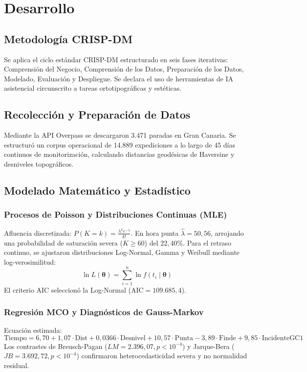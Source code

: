 \documentclass[11pt,a4paper,twoside]{report}
\begin{document}
\chapter{Desarrollo}

\section{Metodología CRISP-DM}
Se aplica el ciclo estándar CRISP-DM estructurado en seis fases iterativas: Comprensión del Negocio, Comprensión de los Datos, Preparación de los Datos, Modelado, Evaluación y Despliegue. Se declara el uso de herramientas de IA asistencial circunscrito a tareas ortotipográficas y estéticas.

\section{Recolección y Preparación de Datos}
Mediante la API Overpass se descargaron 3.471 paradas en Gran Canaria. Se estructuró un corpus operacional de 14.889 expediciones a lo largo de 45 días continuos de monitorización, calculando distancias geodésicas de Haversine y desniveles topográficos.

\section{Modelado Matemático y Estadístico}
\subsection{Procesos de Poisson y Distribuciones Continuas (MLE)}
Afluencia discretizada: $P(K=k) = \frac{\lambda^k e^{-\lambda}}{k!}$. En hora punta $\hat{\lambda} = 50,56$, arrojando una probabilidad de saturación severa ($K \ge 60$) del $22,40\%$.
Para el retraso continuo, se ajustaron distribuciones Log-Normal, Gamma y Weibull mediante log-verosimilitud:
\begin{equation}
\ln L(\boldsymbol{\theta}) = \sum_{i=1}^n \ln f(t_i \mid \boldsymbol{\theta})
\end{equation}
El criterio AIC seleccionó la Log-Normal ($\text{AIC} = 109.685,4$).

\subsection{Regresión MCO y Diagnósticos de Gauss-Markov}
Ecuación estimada:
\begin{equation}
\text{Tiempo} = 6,70 + 1,07 \cdot \text{Dist} + 0,0366 \cdot \text{Desnivel} + 10,57 \cdot \text{Punta} - 3,89 \cdot \text{Finde} + 9,85 \cdot \text{IncidenteGC1}
\end{equation}
Los contrastes de Breusch-Pagan ($LM = 2.396,07, p < 10^{-4}$) y Jarque-Bera ($JB = 3.692,72, p < 10^{-4}$) confirmaron heterocedasticidad severa y no normalidad residual.
\end{document}
